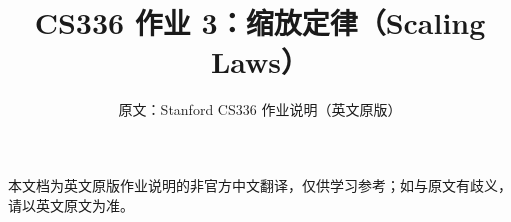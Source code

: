 \documentclass[11pt,a4paper]{ctexart}
\title{\textbf{CS336 作业 3：缩放定律（Scaling Laws）}}
\author{原文：Stanford CS336 作业说明（英文原版）}
\date{}
\begin{document}
\maketitle
\begin{center}\small
本文档为英文原版作业说明的非官方中文翻译，仅供学习参考；如与原文有歧义，请以英文原文为准。
\end{center}
\tableofcontents
\clearpage

\end{document}
